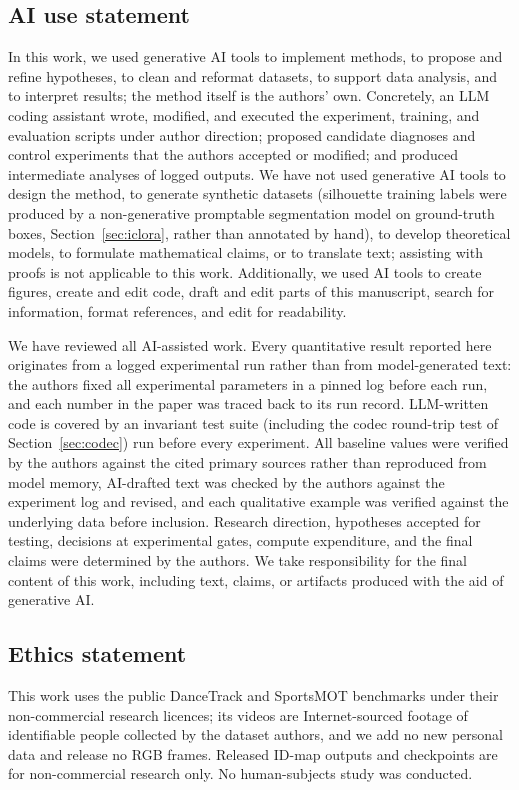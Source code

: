 \documentclass{article} %
\begin{document}
\subsection*{AI use statement}

In this work, we used generative AI tools to implement methods, to propose and refine
hypotheses, to clean and reformat datasets, to support data analysis, and to interpret
results; the method itself is the authors' own. Concretely, an LLM coding assistant wrote,
modified, and executed the experiment, training, and evaluation scripts under author
direction; proposed candidate diagnoses and control experiments that the authors accepted
or modified; and produced intermediate analyses of logged outputs. We have not used
generative AI tools to design the method, to generate synthetic datasets (silhouette
training labels were produced by a non-generative promptable segmentation model on
ground-truth boxes, Section~\ref{sec:iclora}, rather than annotated by hand), to develop
theoretical models, to formulate mathematical claims, or to translate text; assisting with
proofs is not applicable to this work. Additionally, we used AI tools to create figures,
create and edit code, draft and edit parts of this manuscript, search for information,
format references, and edit for readability.

We have reviewed all AI-assisted work. Every quantitative result reported here originates
from a logged experimental run rather than from model-generated text: the authors fixed
all experimental parameters in a pinned log before each run, and each number in the paper
was traced back to its run record. LLM-written code is covered by an invariant test suite
(including the codec round-trip test of Section~\ref{sec:codec}) run before every
experiment. All baseline values were verified by the authors against the cited primary
sources rather than reproduced from model memory, AI-drafted text was checked by the
authors against the experiment log and revised, and each qualitative example was verified
against the underlying data before inclusion. Research direction, hypotheses accepted for
testing, decisions at experimental gates, compute expenditure, and the final claims were
determined by the authors. We take responsibility for the final content of this work,
including text, claims, or artifacts produced with the aid of generative AI.

\subsection*{Ethics statement}
This work uses the public DanceTrack and SportsMOT benchmarks under their non-commercial
research licences; its videos are Internet-sourced footage of identifiable people
collected by the dataset authors, and we add no new personal data and release no RGB
frames. Released ID-map outputs and checkpoints are for non-commercial research only. No
human-subjects study was conducted.
\end{document}
